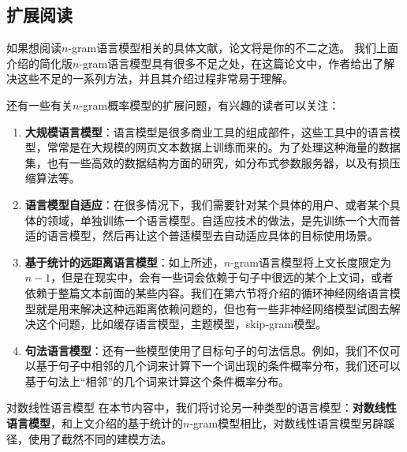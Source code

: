 \documentclass[10pt,a4paper]{ctexart}
\makeatletter
\renewcommand{\section}{\@startsection{section}{1}{0mm}
  {-\baselineskip}{0.5\baselineskip}{\bf\leftline}}
\makeatother
\begin{document}
\subsection{扩展阅读}
如果想阅读$n$-gram语言模型相关的具体文献，论文\cite{goodman2001bit}将是你的不二之选。
我们上面介绍的简化版$n$-gram语言模型具有很多不足之处，在这篇论文中，作者给出了解决这些不足的一系列方法，并且其介绍过程非常易于理解。

还有一些有关$n$-gram概率模型的扩展问题，有兴趣的读者可以关注：
\begin{enumerate}
\item[] \textbf{大规模语言模型}：语言模型是很多商业工具的组成部件，这些工具中的语言模型，常常是在大规模的网页文本数据上训练而来的。为了处理这种海量的数据集，也有一些高效的数据结构方面的研究\cite{heafield2011kenlm,pauls2011faster}，如分布式参数服务器\cite{brants2007large}，以及有损压缩算法\cite{talbot2008randomized}等。
\item[] \textbf{语言模型自适应}：在很多情况下，我们需要针对某个具体的用户、或者某个具体的领域，单独训练一个语言模型。自适应技术的做法，是先训练一个大而普适的语言模型，然后再让这个普适模型去自动适应具体的目标使用场景\cite{bellegarda2004statistical}。
\item[] \textbf{基于统计的远距离语言模型}：如上所述，$n$-gram语言模型将上文长度限定为$n-1$，但是在现实中，会有一些词会依赖于句子中很远的某个上文词，或者依赖于整篇文本前面的某些内容。我们在第六节将介绍的循环神经网络语言模型就是用来解决这种远距离依赖问题的，但也有一些非神经网络模型试图去解决这个问题，比如缓存语言模型\cite{kuhn1990cache}，主题模型\cite{blei2003latent}，skip-gram模型\cite{goodman2001bit}。
\item[] \textbf{句法语言模型}：还有一些模型使用了目标句子的句法信息。例如，我们不仅可以基于句子中相邻的几个词来计算下一个词出现的条件概率分布，我们还可以基于句法上“相邻”的几个词来计算这个条件概率分布\cite{shen2008new}。
\end{enumerate}


\newpage

\section{对数线性语言模型}
在本节内容中，我们将讨论另一种类型的语言模型：\textbf{对数线性语言模型}\cite{rosenfeld1996maximum,chen2000survey}，和上文介绍的基于统计的$n$-gram模型相比，对数线性语言模型另辟蹊径，使用了截然不同的建模方法。
\end{document}
